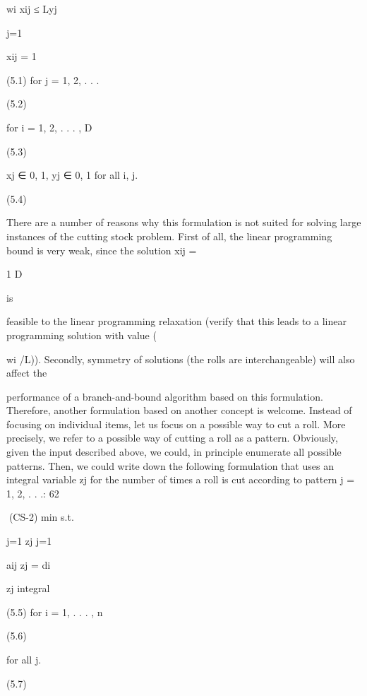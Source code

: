 wi xij ≤ Lyj

j=1

xij = 1

(5.1)
for j = 1, 2, . . .

(5.2)

for i = 1, 2, . . . , D

(5.3)

xj ∈ {0, 1}, yj ∈ {0, 1} for all i, j.

(5.4)

There are a number of reasons why this formulation is not suited for solving large instances of the cutting
stock problem. First of all, the linear programming bound is very weak, since the solution xij =

1
D

is

feasible to the linear programming relaxation (verify that this leads to a linear programming solution
with value (

wi /L)). Secondly, symmetry of solutions (the rolls are interchangeable) will also affect the

performance of a branch-and-bound algorithm based on this formulation. Therefore, another formulation
based on another concept is welcome. Instead of focusing on individual items, let us focus on a possible
way to cut a roll. More precisely, we refer to a possible way of cutting a roll as a pattern. Obviously,
given the input described above, we could, in principle enumerate all possible patterns. Then, we could
write down the following formulation that uses an integral variable zj for the number of times a roll is
cut according to pattern j = 1, 2, . . .:
62

(CS-2) min
s.t.

j=1 zj
j=1

aij zj = di

zj integral

(5.5)
for i = 1, . . . , n

(5.6)

for all j.

(5.7)

